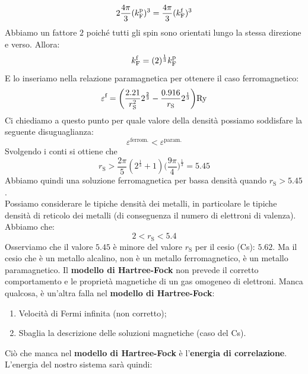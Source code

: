 \begin{equation*}
    2\frac{4\pi}{3}(k_{\text F}^{\text{p}})^3=\frac{4\pi}{3}(k_{\text F}^{\text f})^3
\end{equation*}
Abbiamo un fattore $2$ poiché tutti gli spin sono orientati lungo la stessa direzione e verso. Allora:
\begin{equation*}
    k_{\text F}^{\text f}=(2)^{\frac 13}k_{\text F}^{\text p}
\end{equation*}
E lo inseriamo nella relazione paramagnetica per ottenere il caso ferromagnetico:
\begin{equation*}
    \varepsilon^{\text f}=\bigg(\frac{2.21}{r_\text{S}^2}2^{\frac 23}-\frac{0.916}{r_\text{S}}2^{\frac 13}\bigg)\text{Ry}
\end{equation*}
Ci chiediamo a questo punto per quale valore della densità possiamo soddisfare la seguente disuguaglianza:
\begin{equation*}
    \varepsilon^{\text {ferrom.}} < \varepsilon^{\text {param.}}
\end{equation*}
Svolgendo i conti si ottiene che 
\begin{equation*}
    r_\text{S} > \frac{2\pi}{5}(2^{\frac 13}+1)\bigg(\frac{9\pi}{4}\bigg)^{\frac 13}=5.45
\end{equation*}
Abbiamo quindi una soluzione ferromagnetica per bassa densità quando $r_\text{S} > 5.45$. \\
Possiamo considerare le tipiche densità dei metalli, in particolare le tipiche densità di reticolo dei metalli (di conseguenza il numero di elettroni di valenza). Abbiamo che:
\begin{equation*}
    2<r_\text{S}<5.4
\end{equation*}
Osserviamo che il valore $5.45$ è minore del valore $r_\text{S}$ per il cesio (Cs): $5.62$. Ma il cesio che è un metallo alcalino, non è un metallo ferromagnetico, è un metallo paramagnetico. Il \textbf{modello di Hartree-Fock} non prevede il corretto comportamento e le proprietà magnetiche di un gas omogeneo di elettroni. Manca qualcosa, è un'altra falla nel \textbf{modello di Hartree-Fock}:
\begin{enumerate}
    \item Velocità di Fermi infinita (non corretto);
    \item Sbaglia la descrizione delle soluzioni magnetiche (caso del Cs).
\end{enumerate}
Ciò che manca nel \textbf{modello di Hartree-Fock} è l'\textbf{energia di correlazione}. L'energia del nostro sistema sarà quindi:
